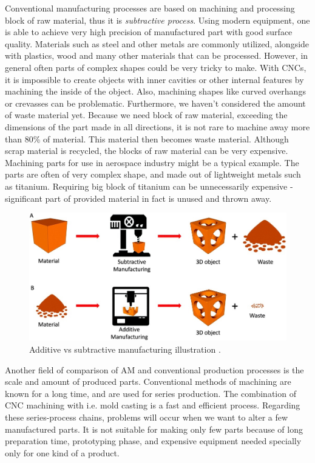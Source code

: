 \documentclass[a4paper, 11pt, reqno]{report}
\begin{document}
	Conventional manufacturing processes are based on machining and processing block of raw material, thus it is \textit{subtractive process}. Using modern equipment, one is able to achieve very high precision of manufactured part with good surface quality. Materials such as steel and other metals are commonly utilized, alongside with plastics, wood and many other materials that can be processed. However, in general often parts of complex shapes could be very tricky to make. With CNCs, it is impossible to create objects with inner cavities or other internal features by machining the inside of the object. Also, machining shapes like curved overhangs or crevasses can be problematic. Furthermore, we haven’t considered the amount of waste material yet. Because we need block of raw material, exceeding the dimensions of the part made in all directions, it is not rare to machine away more than 80\% of material. This material then becomes waste material. Although scrap material is recycled, the blocks of raw material can be very expensive. Machining parts for use in aerospace industry might be a typical example. The parts are often of very complex shape, and made out of lightweight metals such as titanium. Requiring big block of titanium can be unnecessarily expensive - significant part of provided material in fact is unused and thrown away.
\begin{figure}[b!]
\centering
\includegraphics[scale=0.6]{additiveSubtractiveManufacturing}
\caption{Additive vs subtractive manufacturing illustration \cite{AdditiveSubtractive}.}
\end{figure}

	Another field of comparison of AM and conventional production processes is the scale and amount of produced parts. Conventional methods of machining are known for a long time, and are used for series production. The combination of CNC machining with i.e. mold casting is a fast and efficient process. Regarding these series-process chains, problems will occur when we want to alter a few manufactured parts. It is not suitable for making only few parts because of long preparation time, prototyping phase, and expensive equipment needed specially only for one kind of a product.
\end{document}
